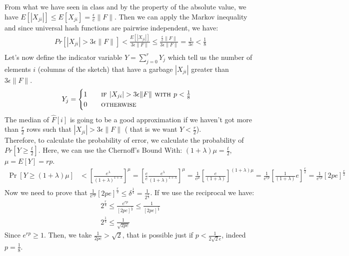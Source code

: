 \documentclass[a4paper]{article}
\begin{document}
From what we have seen in class and by the property of the absolute value, we have $E[|X_{ji}|]\leq E[X_{ji}]= \frac{\epsilon}{e} \|F\|$. Then we can apply the Markov inequality and since universal hash functions are pairwise independent, we have:
\begin{align*}
 Pr[|X_{ji}|>   3\epsilon \|F\| ]< \frac{E[|X_{ji}|]}{3\epsilon \|F\|}\leq \frac{\frac{\epsilon}{e} \|F\|}{3\epsilon \|F\|}= \frac{1}{3e } < \frac{1}{8}\\
\end{align*}
Let's now define the indicator variable $Y=\sum_{j=0}^r Y_j$ which tell us the number of elements $i$ (columns of the sketch) that have a garbage $|X_{ji}|$ greater than $3\epsilon \|F\|$. 
\begin{equation}
Y_{j} =  
\begin{cases} 
1 \qquad \textsc{if } |X_{ji}|>   3\epsilon \|F\|\textsc{ with } p<\frac{1}{8}\\
0 \qquad \textsc{otherwise}
\end{cases}
\nonumber
\end{equation}
The median of $\hat{F}[i]$ is going to be a good approximation if we haven't  got more than $\frac{r}{2}$ rows such that $|X_{ji}|>   3\epsilon \|F\|$ ( that is we want $Y < \frac{r}{2}$). \\
Therefore, to calculate the probability of error, we calculate the probability of $Pr[ Y \geq \frac{t}{2}]$. Here, we can use the Chernoff’s Bound
With: $(1+\lambda )\mu =\frac{t}{2}$, $\mu = E[Y]=rp$.
\begin{align*}
\Pr[Y\geq (1+\lambda )\mu] &< \left[{\frac {e^{\lambda }}{(1+\lambda )^{1+\lambda }}}\right]^{\mu}=\left[{\frac{e}{e} \frac {e^{\lambda }}{(1+\lambda )^{1+\lambda }}}\right]^{\mu}=\frac{1}{e^{\mu}}\left[{\frac {e}{(1+\lambda )}}\right]^{(1+\lambda)\mu}=\frac{1}{e^{rp}}\left[{\frac {1}{(1+\lambda )}e}\right]^{\frac{r}{2}}=\frac{1}{e^{rp}}\left[{2pe}\right]^{\frac{r}{2}}\\
\end{align*}
Now we need to prove that $\frac{1}{e^{rp}}\left[{2pe}\right]^{\frac{r}{2}} \leq \delta^{\frac{1}{4}}=\frac{1}{2^{\frac{r}{4}}}$. If we use the reciprocal we have:
\begin{align*}
2^{\frac{r}{4}} \leq \frac{e^{rp}}{\left[{2pe}\right]^{\frac{r}{2}} }\leq \frac{1}{\left[{2pe}\right]^{\frac{r}{2}} }\\
2^{\frac{1}{4}} \leq \frac{1}{ \sqrt{2pe} } 
\end{align*} 
Since $e^{rp}\geq 1$. Then, we take $\frac{1}{ 2pe } > \sqrt{2} $, that is possible just if $p < \frac{1}{ 2 \sqrt{2}e }$, indeed $p=\frac{1}{8}$.
\end{document}
